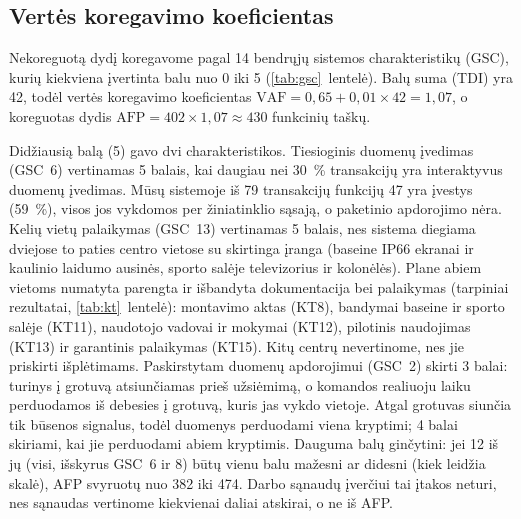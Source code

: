\subsection{Vertės koregavimo koeficientas}

Nekoreguotą dydį koregavome pagal 14 bendrųjų sistemos charakteristikų
(GSC), kurių kiekviena įvertinta balu nuo 0 iki 5 (\ref{tab:gsc}~lentelė).
Balų suma (TDI) yra 42, todėl vertės koregavimo koeficientas
$\mathrm{VAF} = 0{,}65 + 0{,}01 \times 42 = 1{,}07$, o koreguotas dydis
$\mathrm{AFP} = 402 \times 1{,}07 \approx 430$ funkcinių taškų.

Didžiausią balą (5) gavo dvi charakteristikos. Tiesioginis duomenų įvedimas
(GSC~6) vertinamas 5 balais, kai daugiau nei 30~\% transakcijų yra
interaktyvus duomenų įvedimas. Mūsų sistemoje iš 79 transakcijų funkcijų 47
yra įvestys (59~\%), visos jos vykdomos per žiniatinklio sąsają, o
paketinio apdorojimo nėra. Kelių vietų palaikymas (GSC~13) vertinamas
5 balais, nes sistema diegiama dviejose to paties centro vietose su skirtinga
įranga (baseine IP66 ekranai ir kaulinio laidumo ausinės, sporto salėje
televizorius ir kolonėlės). Plane abiem vietoms numatyta parengta ir
išbandyta dokumentacija bei palaikymas (tarpiniai rezultatai,
\ref{tab:kt}~lentelė): montavimo aktas (KT8), bandymai baseine ir sporto
salėje (KT11), naudotojo vadovai ir mokymai (KT12), pilotinis naudojimas
(KT13) ir garantinis palaikymas (KT15). Kitų centrų nevertinome, nes jie
priskirti išplėtimams. Paskirstytam duomenų apdorojimui (GSC~2) skirti
3 balai: turinys į grotuvą atsiunčiamas prieš užsiėmimą, o komandos
realiuoju laiku perduodamos iš debesies į grotuvą, kuris jas vykdo vietoje.
Atgal grotuvas siunčia tik būsenos signalus, todėl duomenys perduodami viena
kryptimi; 4 balai skiriami, kai jie perduodami abiem kryptimis. Dauguma balų
ginčytini: jei 12 iš jų (visi, išskyrus GSC~6 ir 8) būtų vienu balu mažesni
ar didesni (kiek leidžia skalė), AFP svyruotų nuo 382 iki 474. Darbo sąnaudų įverčiui tai
įtakos neturi, nes sąnaudas vertinome kiekvienai daliai atskirai, o ne iš
AFP.


